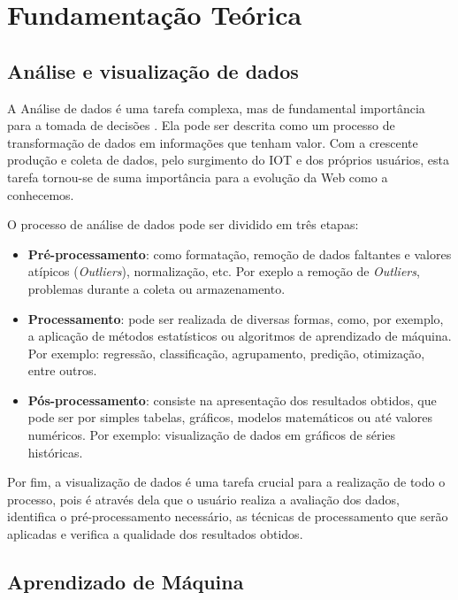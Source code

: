 

\chapter{Fundamentação Teórica}
    \label{cha:fundamentacao-teorica}

    \section{Análise e visualização de dados}

    A Análise de dados é uma tarefa complexa, mas de fundamental importância para a tomada de decisões \cite{guimaraes2004sistema}. Ela pode ser descrita como um processo de transformação de dados em informações que tenham valor. Com a crescente produção e coleta de dados, pelo surgimento do IOT e dos próprios usuários, esta tarefa tornou-se de suma importância para a evolução da Web como a conhecemos.

    O processo de análise de dados pode ser dividido em três etapas:

    \begin{itemize}
        \item \textbf{Pré-processamento}: como formatação, remoção de dados faltantes e valores atípicos (\textit{Outliers}), normalização, etc. Por exeplo a remoção de \textit{Outliers}, problemas durante a coleta ou armazenamento.
        \item \textbf{Processamento}: pode ser realizada de diversas formas, como, por exemplo, a aplicação de métodos estatísticos ou algoritmos de aprendizado de máquina. Por exemplo: regressão, classificação, agrupamento, predição, otimização, entre outros.
        \item \textbf{Pós-processamento}: consiste na apresentação dos resultados obtidos, que pode ser por simples tabelas, gráficos, modelos matemáticos ou até valores numéricos. Por exemplo: visualização de dados em gráficos de séries históricas.
    \end{itemize}

    Por fim, a visualização de dados é uma tarefa crucial para a realização de todo o processo, pois é através dela que o usuário realiza a avaliação dos dados, identifica o pré-processamento necessário, as técnicas de processamento que serão aplicadas e verifica a qualidade dos resultados obtidos.

    \section{Aprendizado de Máquina}

